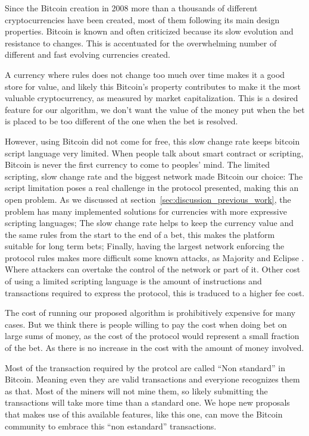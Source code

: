 Since the Bitcoin creation in 2008 more than a thousands of different
  cryptocurrencies have been created, most of them following its main design
  properties.
Bitcoin is known and often criticized because its slow evolution and resistance
  to changes.
This is accentuated for the overwhelming number of different and fast evolving
  currencies created.

A currency where rules does not change too much over time makes it a good store
  for value, and likely this Bitcoin's property contributes to make it the
  most valuable cryptocurrency, as measured by market capitalization.
This is a desired feature for our algorithm, we don't want the value of the
  money put when the bet is placed to be too different of the one when the bet
  is resolved.

However, using Bitcoin did not come for free, this slow change rate keeps
  bitcoin script language very limited.
When people talk about smart contract or scripting, Bitcoin is never the first
  currency to come to peoples' mind.
The limited scripting, slow change rate and the biggest network made Bitcoin our
  choice:
The script limitation poses a real challenge in the protocol presented, making this
  an open problem.
As we discussed at section~\ref{sec:discussion_previous_work}, the problem has
  many implemented solutions for currencies with more expressive scripting
  languages;
The slow change rate helps to keep the currency value and the same rules from
  the start to the end of a bet, this makes the platform suitable for long term
  bets;
Finally, having the largest network enforcing the protocol rules makes more
  difficult some known attacks, as Majority and Eclipse
  \cite{heilman2015eclipse}.
Where attackers can overtake the control of the network or part of it.
Other cost of using a limited scripting language is the amount of instructions
  and transactions required to express the protocol, this is traduced to a
  higher fee cost.

The cost of running our proposed algorithm is prohibitively expensive for many
  cases.
But we think there is people willing to pay the cost when doing bet on large
  sums of money, as the cost of the protocol would represent a small fraction of
  the bet.
As there is no increase in the cost with the amount of money involved.

Most of the transaction required by the protcol are called ``Non standard''
  in Bitcoin.
Meaning even they are valid transactions and everyione recognizes them as that.
Most of the miners will not mine them, so likely submitting the transactions
  will take more time than a standard one.
We hope new proposals that makes use of this available features, like this one,
  can move the Bitcoin community to embrace this ``non estandard'' transactions.

